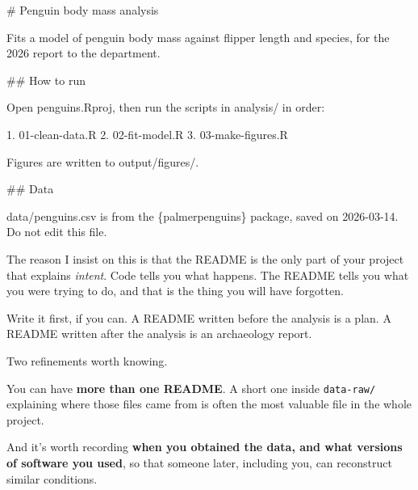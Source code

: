 \documentclass[
  letterpaper,
  justified,
  a4paper]{tufte-book}
\makeatletter
\newenvironment{Shaded}{\begin{snugshade}}{\end{snugshade}}
\newcommand{\FunctionTok}[1]{\textcolor[rgb]{0.28,0.35,0.67}{#1}}
\newcommand{\InformationTok}[1]{\textcolor[rgb]{0.37,0.37,0.37}{#1}}
\newcommand{\NormalTok}[1]{\textcolor[rgb]{0.00,0.23,0.31}{#1}}
\newcommand{\SpecialStringTok}[1]{\textcolor[rgb]{0.13,0.47,0.30}{#1}}
\let\rbporigShaded\Shaded
\let\rbporigendShaded\endShaded
\renewenvironment{Shaded}{%
  \begingroup
  \ifdim\linewidth=\rbpbodywidth
    \advance\linewidth by \@tufte@overhang
    \advance\hsize by \@tufte@overhang
    \advance\columnwidth by \@tufte@overhang
  \fi
  \rbporigShaded
}{%
  \rbporigendShaded
  \endgroup
}
\makeatother
\begin{document}
\begin{Shaded}
\begin{Highlighting}[]
\FunctionTok{\# Penguin body mass analysis}

\NormalTok{Fits a model of penguin body mass against flipper length and species,}
\NormalTok{for the 2026 report to the department.}

\FunctionTok{\#\# How to run}

\NormalTok{Open }\InformationTok{\textasciigrave{}penguins.Rproj\textasciigrave{}}\NormalTok{, then run the scripts in }\InformationTok{\textasciigrave{}analysis/\textasciigrave{}}\NormalTok{ in order:}

\SpecialStringTok{1. }\InformationTok{\textasciigrave{}01{-}clean{-}data.R\textasciigrave{}}
\SpecialStringTok{2. }\InformationTok{\textasciigrave{}02{-}fit{-}model.R\textasciigrave{}}
\SpecialStringTok{3. }\InformationTok{\textasciigrave{}03{-}make{-}figures.R\textasciigrave{}}

\NormalTok{Figures are written to }\InformationTok{\textasciigrave{}output/figures/\textasciigrave{}}\NormalTok{.}

\FunctionTok{\#\# Data}

\InformationTok{\textasciigrave{}data/penguins.csv\textasciigrave{}}\NormalTok{ is from the \{palmerpenguins\} package, saved on}
\NormalTok{2026{-}03{-}14. Do not edit this file.}
\end{Highlighting}
\end{Shaded}

The reason I insist on this is that the README is the only part of your
project that explains \emph{intent}. Code tells you what happens. The
README tells you what you were trying to do, and that is the thing you
will have forgotten.

Write it first, if you can. A README written before the analysis is a
plan. A README written after the analysis is an archaeology report.

Two refinements worth knowing.

You can have \textbf{more than one README}. A short one inside
\texttt{data-raw/} explaining where those files came from is often the
most valuable file in the whole project.

And it's worth recording \textbf{when you obtained the data, and what
versions of software you used}, so that someone later, including you,
can reconstruct similar conditions.
\end{document}
